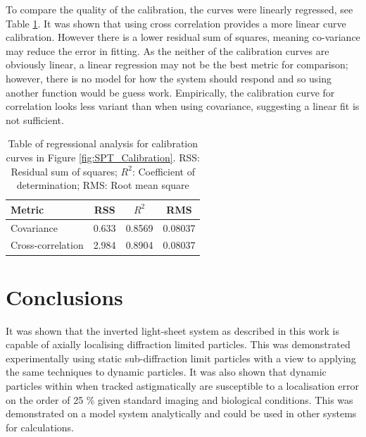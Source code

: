 To compare the quality of the calibration, %
the curves were linearly regressed, see Table \ref{tab:linear_calibration}.
It was shown that using cross correlation provides a more linear curve calibration.
However there is a lower residual sum of squares, meaning co-variance may reduce the error in fitting. %
As the neither of the calibration curves are obviously linear, a linear regression may not be the best metric for comparison; however, there is no model for how the system should respond and so using another function would be guess work.
Empirically, the calibration curve for correlation looks less variant than when using covariance, suggesting a linear fit is not sufficient.

\begin{table}[h]
\centering
\caption{Table of regressional analysis for calibration curves in Figure \ref{fig:SPT_Calibration}.
\label{tab:linear_calibration}
RSS: Residual sum of squares; $R^2$: Coefficient of determination; RMS: Root mean square}
  \begin{tabular}{lccc}
    \toprule
    Metric & RSS & $R^2$ & RMS \\\midrule
    Covariance & 0.633 & 0.8569 & 0.08037 \\
    Cross-correlation & 2.984 & 0.8904 & 0.08037 \\
    \bottomrule
  \end{tabular}
\end{table}



\section{Conclusions}

It was shown that the inverted light-sheet system as described in this work is capable of axially localising diffraction limited particles.
This was demonstrated experimentally using static sub-diffraction limit particles with a view to applying the same techniques to dynamic particles.
It was also shown that dynamic particles within when tracked astigmatically are susceptible to a localisation error on the order of 25 \% given standard imaging and biological conditions.
This was demonstrated on a model system analytically and could be used in other systems for calculations.

